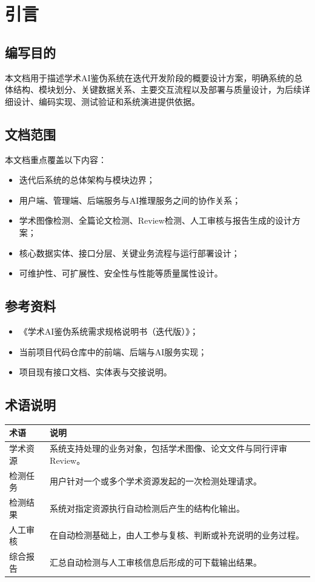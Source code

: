 \section{引言}

\subsection{编写目的}
本文档用于描述学术AI鉴伪系统在迭代开发阶段的概要设计方案，明确系统的总体结构、模块划分、关键数据关系、主要交互流程以及部署与质量设计，为后续详细设计、编码实现、测试验证和系统演进提供依据。

\subsection{文档范围}
本文档重点覆盖以下内容：
\begin{itemize}[leftmargin=2em]
    \item 迭代后系统的总体架构与模块边界；
    \item 用户端、管理端、后端服务与AI推理服务之间的协作关系；
    \item 学术图像检测、全篇论文检测、Review检测、人工审核与报告生成的设计方案；
    \item 核心数据实体、接口分层、关键业务流程与运行部署设计；
    \item 可维护性、可扩展性、安全性与性能等质量属性设计。
\end{itemize}

\subsection{参考资料}
\begin{itemize}[leftmargin=2em]
    \item 《学术AI鉴伪系统需求规格说明书（迭代版）》；
    \item 当前项目代码仓库中的前端、后端与AI服务实现；
    \item 项目现有接口文档、实体表与交接说明。
\end{itemize}

\subsection{术语说明}
\begin{longtable}{|p{4cm}|p{10cm}|}
\hline
术语 & 说明 \\ \hline
学术资源 & 系统支持处理的业务对象，包括学术图像、论文文件与同行评审Review。 \\ \hline
检测任务 & 用户针对一个或多个学术资源发起的一次检测处理请求。 \\ \hline
检测结果 & 系统对指定资源执行自动检测后产生的结构化输出。 \\ \hline
人工审核 & 在自动检测基础上，由人工参与复核、判断或补充说明的业务过程。 \\ \hline
综合报告 & 汇总自动检测与人工审核信息后形成的可下载输出结果。 \\ \hline
\end{longtable}
